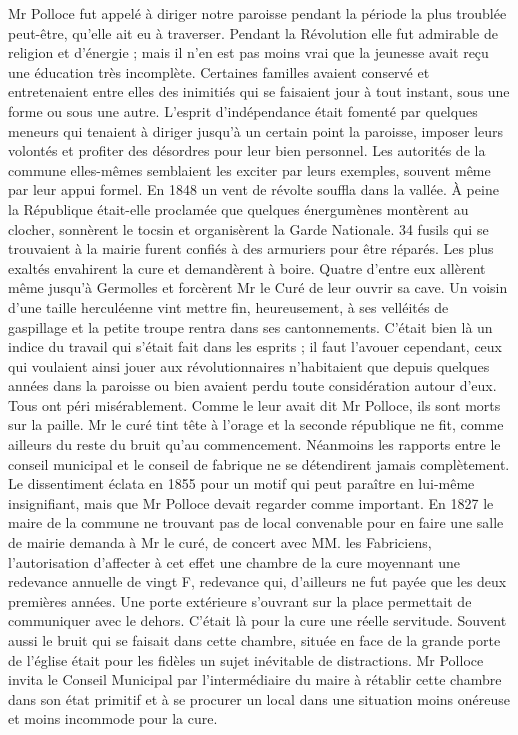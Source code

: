 Mr Polloce fut appelé à diriger notre paroisse pendant la période la plus troublée peut-être, qu'elle ait eu à traverser. Pendant la Révolution elle fut admirable de religion et d'énergie ; mais il n'en est pas moins vrai que la jeunesse avait reçu une éducation très incomplète. Certaines familles avaient conservé et entretenaient entre elles des inimitiés qui se faisaient jour à tout instant, sous une forme ou sous une autre. L'esprit d'indépendance était fomenté par quelques meneurs qui tenaient à diriger jusqu'à un certain point la paroisse, imposer leurs volontés et profiter des désordres pour leur
bien personnel. Les autorités de la commune elles-mêmes semblaient les exciter par leurs exemples, souvent même par leur appui formel.
En 1848 un vent de révolte souffla dans la vallée. À peine la République était-elle proclamée que quelques énergumènes montèrent au clocher, sonnèrent le tocsin et organisèrent la Garde Nationale. 34 fusils qui se trouvaient à la mairie furent confiés à des armuriers pour être réparés. Les plus exaltés envahirent la cure et demandèrent à boire. Quatre d'entre eux allèrent même jusqu'à Germolles et forcèrent Mr le Curé de leur ouvrir sa cave. Un voisin d'une taille herculéenne vint mettre fin, heureusement, à ses velléités de gaspillage et la petite troupe rentra dans ses cantonnements.
C'était bien là un indice du travail qui s'était fait dans les esprits ; il faut l'avouer cependant, ceux qui voulaient ainsi jouer aux révolutionnaires n'habitaient que depuis quelques années dans la paroisse ou bien avaient perdu toute considération autour d'eux. Tous ont péri misérablement. Comme le leur avait dit Mr Polloce, ils sont morts sur la paille.
Mr le curé tint tête à l'orage et la seconde république ne fit, comme ailleurs du reste du bruit qu'au commencement.
Néanmoins les rapports entre le conseil municipal et le conseil de fabrique ne se détendirent jamais complètement. Le dissentiment éclata en 1855 pour un motif qui peut paraître en lui-même insignifiant, mais que Mr Polloce devait regarder comme important.
En 1827 le maire de la commune ne trouvant pas de local convenable pour en faire une salle de mairie demanda à Mr le curé, de concert avec MM. les Fabriciens, l'autorisation d'affecter à cet effet une chambre de la cure moyennant une redevance annuelle de vingt F, redevance qui, d'ailleurs ne fut payée que les deux premières années. Une porte extérieure s'ouvrant sur la place permettait de communiquer avec le dehors. C'était là pour la cure une réelle servitude. Souvent aussi le bruit qui se faisait dans cette chambre, située en face de la grande porte de l'église était pour les fidèles un sujet inévitable de distractions. Mr Polloce invita le Conseil Municipal par l'intermédiaire du maire à rétablir cette chambre dans son état primitif et à se procurer un local dans une situation moins onéreuse
et moins incommode pour la cure.

